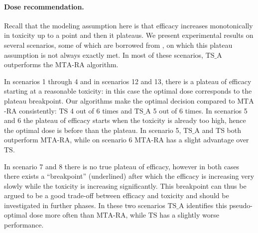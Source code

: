 \paragraph{Dose recommendation.}  
Recall that the modeling assumption here is that efficacy increases monotonically in toxicity up to a point and then it plateaus. We present experimental results on several scenarios, some of which are borrowed from \cite{MKR17}, on which this plateau assumption is not always exactly met. In most of these scenarios, $\mathrm{TS}\_\mathrm{A}$ outperforms the $\mathrm{MTA}$-$\mathrm{RA}$ algorithm.

In scenarios 1 through 4 and in scenarios 12 and 13, there is a plateau of efficacy starting at a reasonable toxicity: in this case the optimal dose corresponds to the plateau breakpoint. Our algorithms make the optimal decision compared to $\mathrm{MTA}$-$\mathrm{RA}$ consistently: $\mathrm{TS}$ 4 out of 6 times and $\mathrm{TS}\_\mathrm{A}$ 5 out of 6 times. In scenarios 5 and 6 the plateau of efficacy starts when the toxicity is already too high, hence the optimal dose is before than the plateau. In scenario 5,  $\mathrm{TS}\_\mathrm{A}$ and $\mathrm{TS}$ both outperform $\mathrm{MTA}$-$\mathrm{RA}$, while on scenario 6 $\mathrm{MTA}$-$\mathrm{RA}$ has a slight advantage over $\mathrm{TS}$. 


In scenario 7 and 8 there is no true plateau of efficacy, however in both cases there exists a ``breakpoint'' (underlined) after which the efficacy is increasing very slowly while the toxicity is increasing significantly. This breakpoint can thus be argued to be a good trade-off between efficacy and toxicity and should be investigated in further phases. In these two scenarios $\mathrm{TS}\_\mathrm{A}$ identifies this pseudo-optimal dose more often than $\mathrm{MTA}$-$\mathrm{RA}$, while  $\mathrm{TS}$ has a slightly worse performance. 


